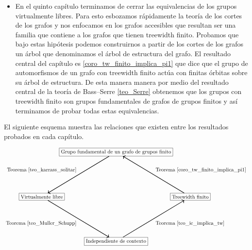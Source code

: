 \documentclass[tesis.tex]{subfiles}
\begin{document}
\begin{itemize}
		\item 
			En el quinto capítulo terminamos de cerrar las equivalencias de los grupos virtualmente libres.
			Para esto esbozamos rápidamente la teoría de los cortes de los grafos y nos enfocamos en los grafos accesibles que resultan ser una familia que contiene a los grafos que tienen treewidth finito.
			Probamos que bajo estas hipótesis podemos construirnos a partir de los cortes de los grafos un árbol que denominamos el árbol de estructura del grafo.
			El resultado central del capítulo es \ref{coro_tw_finito_implica_pi1} que dice que el grupo de automorfismos de un grafo con treewidth finito actúa con finitas órbitas sobre su árbol de estructura. 
			De esta manera manera por medio del resultado central de la teoría de Bass--Serre  \ref{teo_Serre} obtenemos que los grupos con treewidth finito son grupos fundamentales de grafos de grupos finitos y así terminamos de probar todas estas equivalencias.
	\end{itemize}
		
	
	
	
	El siguiente esquema muestra las relaciones que existen entre los resultados probados en cada capítulo.
	
	\[	
	\begin{tikzpicture}
		\path 
		(0,0) node(a) [rectangle,draw] {Grupo fundamental de un grafo de grupos finito}
		(5,-3) node(b) [rectangle,draw] {Treewidth finito}
		(0,-6) node(c) [rectangle,draw] {Independiente de contexto}
		(-5,-3) node (d) [rectangle,draw] {Virtualmente libre};
		\draw   
		(d) edge[<-,line width=1.0pt,"Teorema \ref{teo_karrass_solitar}"] (a) 
		(c) edge[<-,line width=1.0pt,"Teorema \ref{teo_Muller_Schupp}"] (d)
		(b) edge[<-,line width=1.0pt,"Teorema \ref{teo_ic_implica_tw}"] (c)
		(a)  edge[<-,line width=1.0pt,"Teorema \ref{coro_tw_finito_implica_pi1}"] (b);
	\end{tikzpicture}
	\]
	
	
	
	
	
	
	
\end{document}
